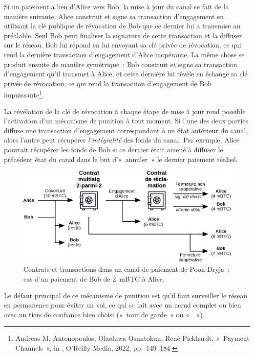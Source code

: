 Si un paiement a lieu d'Alice vers Bob, la mise à jour du canal se fait de la manière suivante. Alice construit et signe sa transaction d'engagement en utilisant la clé publique de révocation de Bob que ce dernier lui a transmise au préalable. Seul Bob peut finaliser la signature de cette transaction et la diffuser sur le réseau. Bob lui répond en lui envoyant sa clé privée de révocation, ce qui rend la dernière transaction d'engagement d'Alice inopérante. La même chose se produit ensuite de manière symétrique~: Bob construit et signe sa transaction d'engagement qu'il transmet à Alice, et cette dernière lui révèle en échange sa clé privée de révocation, ce qui rend la transaction d'engagement de Bob impuissante\footnote{Andreas M. Antonopoulos, Olaoluwa Osuntokun, René Pickhardt, «~Payment Channels~», in , O'Reilly Media, 2022, pp.~149--184.}.

La révélation de la clé de révocation à chaque étape de mise à jour rend possible l'activation d'un mécanisme de punition à tout moment. Si l'une des deux parties diffuse une transaction d'engagement correspondant à un état antérieur du canal, alors l'autre peut récupérer \emph{l'intégralité} des fonds du canal. Par exemple, Alice pourrait récupérer les fonds de Bob si ce dernier était amené à diffuser le précédent état du canal dans le but d'«~annuler~» le dernier paiement réalisé.

\begin{figure}[ht]
  \centering
  \includegraphics[scale=0.8]{img/lightning-poon-dryja-channel-contracts.eps}
  \caption{Contrats et transactions dans un canal de paiement de Poon-Dryja~: cas d'un paiement de Bob de 2~mBTC à Alice.}
  \label{fig:poon-dryja-contracts}
\end{figure}

Le défaut principal de ce mécanisme de punition est qu'il faut surveiller le réseau en permanence pour éviter un vol, ce qui se fait avec un nœud complet ou bien avec un tiers de confiance bien choisi («~tour de garde~» ou «~~»).

